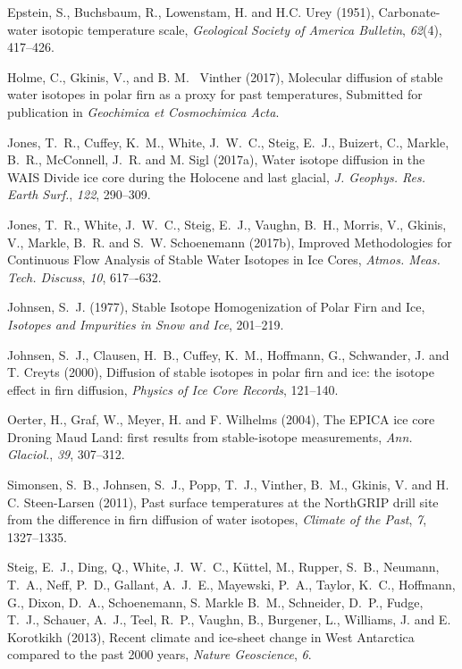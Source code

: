 \documentclass[draft, jgrga]{AGUTeX}
\begin{document}
\begin{article}
\begin{thebibliography}{}
Epstein, S., Buchsbaum, R., Lowenstam, H. and H.C. Urey (1951),
Carbonate-water isotopic temperature scale,
\textit{Geological Society of America Bulletin}, \textit{62}(4), 417--426.

Holme, C., Gkinis, V., and B. M. ~Vinther (2017), Molecular
diffusion of stable water isotopes in polar firn as a proxy
for past temperatures, Submitted for publication in \textit{Geochimica et Cosmochimica Acta}.

Jones, T.~R., Cuffey, K.~M., White, J.~W.~C., Steig, E.~J., Buizert, C., 
Markle, B.~R., McConnell, J.~R. and M. Sigl (2017a),
{Water isotope diffusion in the WAIS Divide ice core
	during the Holocene and last glacial},
\textit{J. Geophys. Res. Earth Surf.}, \textit{122}, 290–309.

Jones, T.~R., White, J.~W.~C., Steig, E.~J., Vaughn, B.~H., Morris, V., 
Gkinis, V., Markle, B.~R. and S.~W. Schoenemann (2017b),
{Improved Methodologies for Continuous Flow Analysis of Stable
Water Isotopes in Ice Cores},
\textit{Atmos. Meas. Tech. Discuss}, \textit{10}, 617–-632.

Johnsen, S.~J. (1977),
{Stable Isotope Homogenization of Polar Firn and Ice},
\textit{Isotopes and Impurities in Snow and Ice}, 201--219.

Johnsen, S.~J., Clausen, H.~B., Cuffey, K.~M., Hoffmann, G., Schwander, J. and T. Creyts (2000),
{Diffusion of stable isotopes in polar firn and ice: the isotope effect in firn diffusion},
\textit{Physics of Ice Core Records}, 121--140.

Oerter, H., Graf, W., Meyer, H. and F. Wilhelms (2004),
{The EPICA ice core Droning Maud Land: first results from stable-isotope measurements},
\textit{Ann. Glaciol.}, \textit{39}, 307--312.

Simonsen, S.~B., Johnsen, S.~J., Popp, T.~J., Vinther, B.~M., Gkinis, V. and H. C. Steen-Larsen (2011),
{Past surface temperatures at the NorthGRIP drill site from the difference in firn diffusion of water isotopes},
\textit{Climate of the Past}, \textit{7}, 1327--1335.

Steig, E.~J., Ding, Q., White, J.~W.~C., Küttel, M., Rupper, S.~B., Neumann, T.~A., Neff, P.~D., Gallant, A.~J.~E., Mayewski, P.~A.,
Taylor, K.~C., Hoffmann, G., Dixon, D.~A., Schoenemann, S. Markle B.~M., Schneider, D.~P., Fudge, T.~J., 
Schauer, A.~J., Teel, R.~P., Vaughn, B., Burgener, L., Williams, J. and E. Korotkikh (2013),
{Recent climate and ice-sheet change in West Antarctica compared to the past 2000 years},
\textit{Nature Geoscience}, \textit{6}.


\end{thebibliography}
\end{article}
\end{document}
